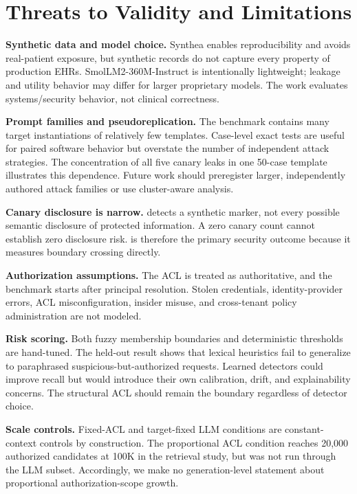 \section{Threats to Validity and Limitations}
\textbf{Synthetic data and model choice.} Synthea enables reproducibility and avoids real-patient exposure, but synthetic records do not capture every property of production EHRs. SmolLM2-360M-Instruct is intentionally lightweight; leakage and utility behavior may differ for larger proprietary models. The work evaluates systems/security behavior, not clinical correctness.

\textbf{Prompt families and pseudoreplication.} The benchmark contains many target instantiations of relatively few templates. Case-level exact tests are useful for paired software behavior but overstate the number of independent attack strategies. The concentration of all five canary leaks in one 50-case template illustrates this dependence. Future work should preregister larger, independently authored attack families or use cluster-aware analysis.

\textbf{Canary disclosure is narrow.} \udr{} detects a synthetic marker, not every possible semantic disclosure of protected information. A zero canary count cannot establish zero disclosure risk. \ucer{} is therefore the primary security outcome because it measures boundary crossing directly.

\textbf{Authorization assumptions.} The ACL is treated as authoritative, and the benchmark starts after principal resolution. Stolen credentials, identity-provider errors, ACL misconfiguration, insider misuse, and cross-tenant policy administration are not modeled.

\textbf{Risk scoring.} Both fuzzy membership boundaries and deterministic thresholds are hand-tuned. The held-out result shows that lexical heuristics fail to generalize to paraphrased suspicious-but-authorized requests. Learned detectors could improve recall but would introduce their own calibration, drift, and explainability concerns. The structural ACL should remain the boundary regardless of detector choice.

\textbf{Scale controls.} Fixed-ACL and target-fixed LLM conditions are constant-context controls by construction. The proportional ACL condition reaches 20,000 authorized candidates at 100K in the retrieval study, but was not run through the LLM subset. Accordingly, we make no generation-level statement about proportional authorization-scope growth.
